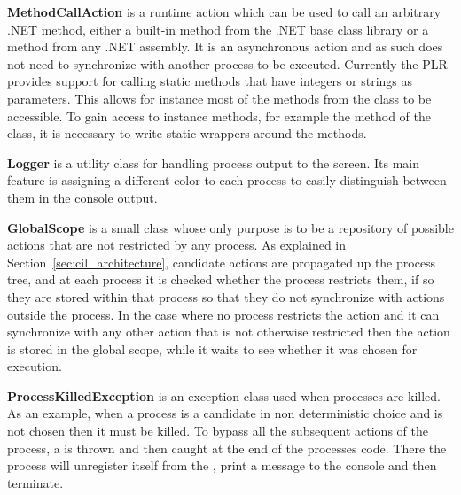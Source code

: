 	\textbf{MethodCallAction} is a runtime action which can be used to call
	an arbitrary .NET method, either a built-in method from the .NET base
	class library or a method from any .NET assembly. It is an asynchronous 
	action and as such does not need to synchronize with another process to be 
	executed. Currently	the PLR provides support for calling static methods 
	that have integers or	strings as parameters. This allows for instance most
	of the methods from the  class to be accessible. To
	gain access to instance methods, for example the  method
	of the  class, it is necessary to write static wrappers
	around the methods.

	\textbf{Logger} is a utility class for handling process output to the screen.
	Its main feature is assigning a different color to each process to 
	easily distinguish between them in the console output.

	\textbf{GlobalScope} is a small class whose only purpose is to be a 
	repository of possible actions that are not restricted by any process. As
	explained in Section~\ref{sec:cil_architecture}, candidate actions are 
	propagated up the process tree, and at each process it is checked whether 
	the process restricts them, if so they are stored within that process so 
	that they do not synchronize with actions outside the process. In the case 
	where no process restricts the action and it can synchronize with any other 
	action that is not otherwise restricted then the action is stored in the 
	global scope, while it waits to see whether it was chosen for execution.
	
	\textbf{ProcessKilledException} is an exception class used when processes
	are killed. As an example, when a process is a candidate in non deterministic
	choice and is not chosen then it must be killed. To bypass all the subsequent
	actions of the process, a  is thrown and then
	caught at the end of the processes code. There the process will unregister
	itself from the , print a message to the console and then
	terminate.
	
